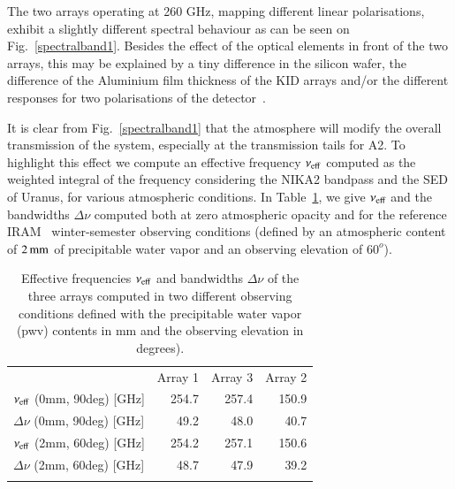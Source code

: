 The two arrays operating at 260 GHz, mapping different linear polarisations,
exhibit a slightly different spectral behaviour as can be
seen on Fig.~\ref{spectralband1}. {\lp Besides the effect of the
optical elements in front of the two arrays, this may be explained by
a tiny difference in the silicon wafer, the difference of the
Aluminium film thickness of the KID arrays and/or the different
responses for two polarisations of the
detector~\citep{Adam2018, Shu2018_bandpass}.}

It is clear from Fig.~\ref{spectralband1} that the atmosphere will
modify the overall transmission of the system, especially at the
transmission tails for A2. {\lp To highlight this effect we compute an effective
frequency $\nu_{\rm{eff}}$ computed as the weighted integral of the
frequency considering the NIKA2 bandpass and the SED of Uranus, for
various atmospheric conditions.}
In Table~\ref{tab:frequencies}, we give $\nu_{\rm{eff}}$ and the
bandwidths $\Delta \nu$ computed both at zero atmospheric opacity and for the
reference IRAM \trentemetre\ winter-semester observing conditions
(defined by an atmospheric content of $2\,\rm{mm}$ of precipitable
water vapor and an observing elevation of $60^o$).

\begin{table}[!htbp]
  \caption[]{Effective frequencies $\nu_{\rm{eff}}$ and bandwidths
    $\Delta \nu$
    of the three arrays computed in two different observing conditions
    defined with the precipitable water vapor (pwv) contents in mm and
    the observing elevation in degrees).}
  \label{tab:frequencies}
  \centering    
  \begin{tabular}{lrrr}
    \hline\hline
    \noalign{\smallskip}
    & Array 1 & Array 3 & Array 2 \\
    \noalign{\smallskip}
    \hline
    \noalign{\smallskip}
    $\nu_{\rm{eff}}$ \small{(0mm, 90deg)} [GHz] & 254.7 & 257.4 &  150.9 \\
    $\Delta \nu$ \small{(0mm, 90deg)} [GHz] &  49.2 & 48.0  &   40.7 \\
    $\nu_{\rm{eff}}$ \small{(2mm, 60deg)} [GHz] & 254.2 & 257.1 &  150.6 \\
    $\Delta \nu$ \small{(2mm, 60deg)} [GHz] &  48.7 &  47.9 &    39.2 \\
    \noalign{\smallskip}
    \hline
  \end{tabular}
\end{table}

